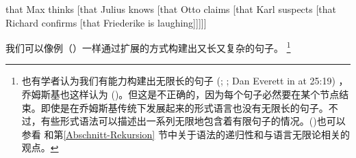 \ea
\label{ex-that-max-thinks-that-recursion}
that Max thinks [that Julius knows [that Otto claims [that Karl suspects [that Richard confirms [that Friederike is laughing]]]]]
\z

\noindent
我们可以像例（）一样通过扩展的方式构建出又长又复杂的句子。
\footnote{也有学者认为我们有能力构建出无限长的句子 (\citealp*[]{NKN2001a}; \citealp[]{KS2008a-u}; Dan Everett in  at 25:19) ，乔姆斯基也这样认为 (\citep[]{Leiss2003a})。但这是不正确的，因为每个句子必然要在某个节点结束。即使是在乔姆斯基传统下发展起来的形式语言也没有无限长的句子。不过，有些形式语法可以描述出一系列无限地包含着有限句子的情况。(\citealp[]{Chomsky57a})也可以参看  和第\ref{Abschnitt-Rekursion} 节中关于语法的递归性和与语言无限论相关的观点。}


